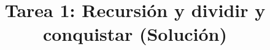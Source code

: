 \documentclass{doc}
\title{Tarea 1: Recursión y dividir y conquistar (Solución)}
\begin{document}
\makedocheader
\soluciontrue

\end{document}

